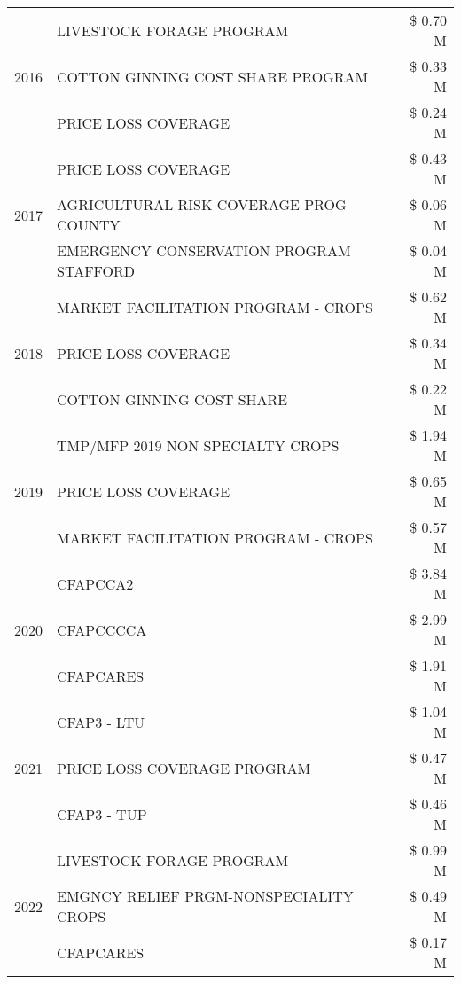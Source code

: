 \begin{tabular}{llr}
\cline{1-3}
\multirow[t]{3}{*}{2016} & LIVESTOCK FORAGE PROGRAM & \$ 0.70 M \\
 & COTTON GINNING COST SHARE PROGRAM & \$ 0.33 M \\
 & PRICE LOSS COVERAGE & \$ 0.24 M \\
\cline{1-3}
\multirow[t]{3}{*}{2017} & PRICE LOSS COVERAGE & \$ 0.43 M \\
 & AGRICULTURAL RISK COVERAGE PROG - COUNTY & \$ 0.06 M \\
 & EMERGENCY CONSERVATION PROGRAM STAFFORD & \$ 0.04 M \\
\cline{1-3}
\multirow[t]{3}{*}{2018} & MARKET FACILITATION PROGRAM - CROPS & \$ 0.62 M \\
 & PRICE LOSS COVERAGE & \$ 0.34 M \\
 & COTTON GINNING COST SHARE & \$ 0.22 M \\
\cline{1-3}
\multirow[t]{3}{*}{2019} & TMP/MFP 2019 NON SPECIALTY CROPS & \$ 1.94 M \\
 & PRICE LOSS COVERAGE & \$ 0.65 M \\
 & MARKET FACILITATION PROGRAM - CROPS & \$ 0.57 M \\
\cline{1-3}
\multirow[t]{3}{*}{2020} & CFAPCCA2 & \$ 3.84 M \\
 & CFAPCCCCA & \$ 2.99 M \\
 & CFAPCARES & \$ 1.91 M \\
\cline{1-3}
\multirow[t]{3}{*}{2021} & CFAP3 - LTU & \$ 1.04 M \\
 & PRICE LOSS COVERAGE PROGRAM & \$ 0.47 M \\
 & CFAP3 - TUP & \$ 0.46 M \\
\cline{1-3}
\multirow[t]{3}{*}{2022} & LIVESTOCK FORAGE PROGRAM & \$ 0.99 M \\
 & EMGNCY RELIEF PRGM-NONSPECIALITY CROPS & \$ 0.49 M \\
 & CFAPCARES & \$ 0.17 M \\
\cline{1-3}
\bottomrule
\end{tabular}
